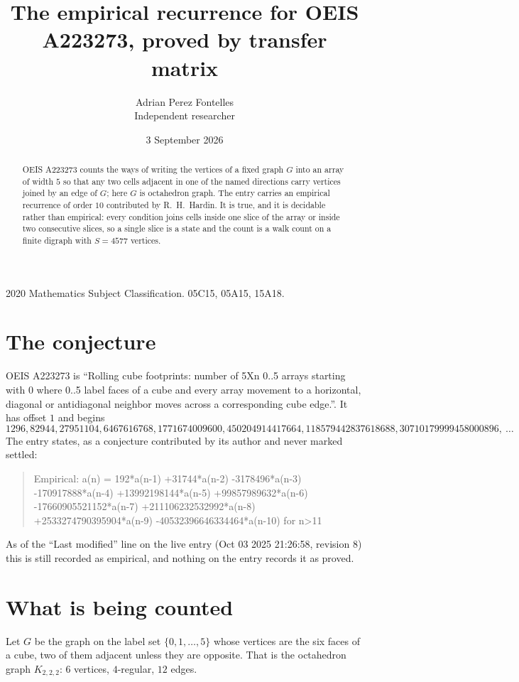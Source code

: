 \documentclass[11pt,a4paper]{article}
\title{The empirical recurrence for OEIS A223273, proved by transfer matrix}
\author{Adrian Perez Fontelles\\ \small Independent researcher}
\date{3 September 2026}
\theoremstyle{plain}
\theoremstyle{definition}
\begin{document}
\maketitle

\begin{abstract}
OEIS A223273 counts the ways of writing the vertices of a fixed graph $G$ into an array of width
$5$ so that any two cells adjacent in one of the named directions carry vertices joined by an
edge of $G$; here $G$ is octahedron graph. The entry carries an empirical recurrence of order $10$
contributed by R.~H.~Hardin. It is true, and it is decidable rather than empirical: every
condition joins cells inside one slice of the array or inside two consecutive slices, so a
single slice is a state and the count is a walk count on a finite digraph with $S=4577$ vertices.
\end{abstract}

\noindent\small 2020 Mathematics Subject Classification. 05C15, 05A15, 15A18.\normalsize

\section{The conjecture}

OEIS A223273 is ``Rolling cube footprints: number of 5Xn 0..5 arrays starting with 0 where 0..5 label faces of a cube and every array movement to a horizontal, diagonal or antidiagonal neighbor moves across a corresponding cube edge.''. It has offset $1$ and begins
\[
1296, 82944, 27951104, 6467616768, 1771674009600, 450204914417664, 118579442837618688, 30710179999458000896,\ \dots
\]
The entry states, as a conjecture contributed by its author and never marked settled:
\begin{quote}
Empirical: a(n) = 192*a(n-1) +31744*a(n-2) -3178496*a(n-3) -170917888*a(n-4) +13992198144*a(n-5) +99857989632*a(n-6) -17660905521152*a(n-7) +211106232532992*a(n-8) +2533274790395904*a(n-9) -40532396646334464*a(n-10) for n>11
\end{quote}
As of the ``Last modified'' line on the live entry (Oct 03 2025 21:26:58, revision 8) this is still
recorded as empirical, and nothing on the entry records it as proved.

\section{What is being counted}

Let $G$ be the graph on the label set $\{0,1,\dots,5\}$ whose vertices are the six faces of a cube, two of them adjacent unless they are opposite. That is the octahedron graph $K_{2,2,2}$: $6$ vertices, $4$-regular, $12$ edges.
\end{document}
